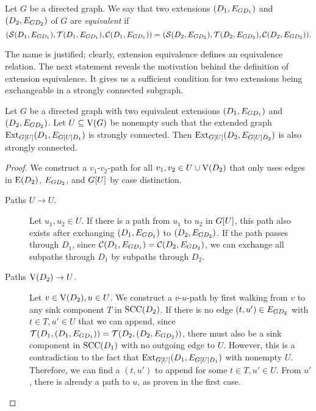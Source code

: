 \begin{theorem}
\begin{lemma}
\begin{theorem}
\begin{definition}
    Let $G$ be a directed graph. We say that two extensions $({D_{1}}, E_{{G}{D_{1}}})$ and $({D_{2}}, E_{{G}{D_{2}}})$ of $G$ are \emph{equivalent} if \[(\operatorname{\mathcal{S}}({D_1,E_{GD_1}}), \operatorname{\mathcal{T}}({D_1,E_{GD_1}}), \operatorname{\mathcal{C}}({D_1,E_{GD_1}})) = (\operatorname{\mathcal{S}}({D_2,E_{GD_2}}), \operatorname{\mathcal{T}}({D_2,E_{GD_2}}), \operatorname{\mathcal{C}}({D_2,E_{GD_2}})).\]%
\end{definition}

The name is justified; clearly, extension equivalence defines an equivalence relation.
The next statement reveals the motivation behind the definition of extension equivalence. It gives us a sufficient condition for two extensions being exchangeable in a strongly connected subgraph.

\begin{lemma}
\label{lem:source_sink_conn_equiv}
  Let $G$ be a directed graph with two equivalent extensions $({D_{1}}, E_{{G}{D_{1}}})$ and $({D_{2}}, E_{{G}{D_{2}}})$. Let $U \subseteq \operatorname{V}({G})$ be nonempty such that the extended graph $\operatorname{\textrm{Ext}}_{{G}[{U}]}({D_1}, {E_{{{G}[{U}]}{D_1}}})$ is strongly connected. Then $\operatorname{\textrm{Ext}}_{{G}[{U}]}({D_2}, {E_{{{G}[{U}]}{D_2}}})$ is also strongly connected.
\end{lemma}
\begin{proof}
  We construct a $v_1$-$v_2$-path for all $v_1, v_2 \in U \cup \operatorname{V}({D_2})$ that only uses edges in $\operatorname{E}({D_2})$, $E_{{G}{D_2}}$, and ${G}[{U}]$ by case distinction.

\begin{description}
    \item[Paths $U \to U$.]  Let $u_1, u_2 \in U$. If there is a path from $u_1$ to $u_2$ in ${G}[{U}]$, this path also exists after exchanging $({D_1}, E_{{G}{D_1}})$ to $({D_2}, E_{{G}{D_2}})$. If the path passes through $D_1$, since $\operatorname{\mathcal{C}}({D_1,E_{GD_1}}) = \operatorname{\mathcal{C}}({D_2,E_{GD_2}})$, we can exchange all subpaths through $D_1$ by subpaths through $D_2$.

    \item[Paths $\operatorname{V}({D_2}) \to U$.] Let $v \in \operatorname{V}({D_2}), u \in U$. We construct a $v$-$u$-path by first walking from $v$ to any sink component $T$ in $\operatorname{\textrm{SCC}}({D_2})$. If there is no edge $(t,u') \in E_{{G}{D_2}}$ with $t \in T, u' \in U$ that we can append, since $\operatorname{\mathcal{T}}({D_1,({D_1}, E_{{G}{D_1}})}) = \operatorname{\mathcal{T}}({D_2,({D_2}, E_{{G}{D_2}})})$, there must also be a sink component in $\operatorname{\textrm{SCC}}({D_1})$ with no outgoing edge to $U$. However, this is a contradiction to the fact that $\operatorname{\textrm{Ext}}_{{G}[{U}]}({D_1}, {E_{{{G}[{U}]}{D_1}}})$ with nonempty $U$. Therefore, we can find a $(t,u')$ to append for some $t \in T, u' \in U$. From $u'$, there is already a path to $u$, as proven in the first case.


\end{description}
\end{proof}
\end{theorem}
\end{lemma}
\end{theorem}
